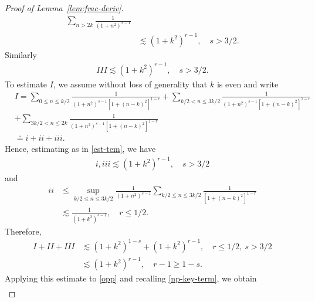 \documentclass[12pt,reqno]{amsart}
\numberwithin{equation}{section}  %
\numberwithin{figure}{section}
\begin{document}
\begin{proof}[Proof of Lemma~\ref{lem:frac-deriv}]
\begin{equation}
\begin{split}
\sum_{n > 2k} \frac{1}{(1 + n^{2})^{s-1}} 
\\
& \lesssim (1 + k^{2})^{r-1}, \quad
s > 3/2.
\end{split}
\end{equation}
Similarly
%
%
\begin{equation*}
\begin{split}
III \lesssim (1 + k^{2})^{r-1}, \quad s > 3/2.
\end{split}
\end{equation*}
%
%
%
To estimate $I$, we assume without loss of generality that $k$ is even and write
%
%
\begin{equation*}
\begin{split}
&  I = \sum_{0 \le n \le k/2} \frac{1}{(1 + n^{2})^{s-1}[1 + (n - k)^{2}]^{1-r}} 
+ \sum_{k/2 < n \le 3k/2} \frac{1}{(1 + n^{2})^{s-1}[1 + (n - k)^{2}]^{1-r}} 
\\
& + \sum_{3k/2 < n \le 2k} \frac{1}{(1 + n^{2})^{s-1}[1 + (n - k)^{2}]^{1-r}} 
\\
& \doteq i + ii + iii.
\end{split} 
\end{equation*}
Hence, estimating as in \eqref{est-tem}, we have
%
%
\begin{equation*}
\begin{split}
i, iii \lesssim (1 + k^{2})^{r-1}, \quad
s > 3/2
\end{split}
\end{equation*}
%
and
%
%
\begin{equation*}
\begin{split}
ii & \le \sup_{k/2 \le n \le 3k/2} \frac{1}{\left( 1 + n^{2} \right)^{s-1}}
\sum_{k/2 \le n \le 3k/2} \frac{1}{[1 + (n-k)^{2}]^{1-r}} \\
& \lesssim \frac{1}{(1 + k^{2})^{s-1}}, \quad r \le 1/2.
\end{split}
\end{equation*}
%
%
Therefore, 
%
%
%
\begin{equation*}
\begin{split}
I + II + III & \lesssim (1 + k^{2})^{1-s} + (1 + k^{2})^{r-1}, \quad r \le 1/2, \ s > 3/2
\\
& \lesssim  (1 + k^{2})^{r-1}, \quad r -1 \ge 1-s.
\end{split}
\end{equation*}
%
Applying this estimate to \eqref{opp} and recalling \eqref{np-key-term},
we obtain
%
%
%
%
\begin{equation}
\label{yhh}
\begin{split}

\end{split}
\end{equation}
\end{proof}
\end{document}
